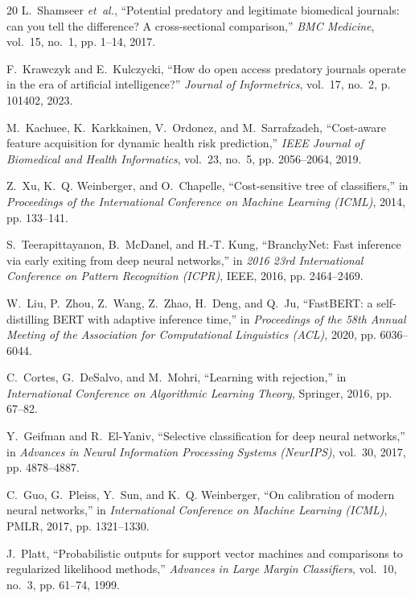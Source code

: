 \documentclass[journal]{IEEEtran}
\begin{document}
\begin{thebibliography}{20}
L.~Shamseer \emph{et~al.}, ``Potential predatory and legitimate biomedical journals: can you tell the difference? A cross-sectional comparison,'' \emph{BMC Medicine}, vol.~15, no.~1, pp. 1--14, 2017.

F.~Krawczyk and E.~Kulczycki, ``How do open access predatory journals operate in the era of artificial intelligence?'' \emph{Journal of Informetrics}, vol.~17, no.~2, p. 101402, 2023.

M.~Kachuee, K.~Karkkainen, V.~Ordonez, and M.~Sarrafzadeh, ``Cost-aware feature acquisition for dynamic health risk prediction,'' \emph{IEEE Journal of Biomedical and Health Informatics}, vol.~23, no.~5, pp. 2056--2064, 2019.

Z.~Xu, K.~Q. Weinberger, and O.~Chapelle, ``Cost-sensitive tree of classifiers,'' in \emph{Proceedings of the International Conference on Machine Learning (ICML)}, 2014, pp. 133--141.

S.~Teerapittayanon, B.~McDanel, and H.-T. Kung, ``BranchyNet: Fast inference via early exiting from deep neural networks,'' in \emph{2016 23rd International Conference on Pattern Recognition (ICPR)}, IEEE, 2016, pp. 2464--2469.

W.~Liu, P.~Zhou, Z.~Wang, Z.~Zhao, H.~Deng, and Q.~Ju, ``FastBERT: a self-distilling BERT with adaptive inference time,'' in \emph{Proceedings of the 58th Annual Meeting of the Association for Computational Linguistics (ACL)}, 2020, pp. 6036--6044.

C.~Cortes, G.~DeSalvo, and M.~Mohri, ``Learning with rejection,'' in \emph{International Conference on Algorithmic Learning Theory}, Springer, 2016, pp. 67--82.

Y.~Geifman and R.~El-Yaniv, ``Selective classification for deep neural networks,'' in \emph{Advances in Neural Information Processing Systems (NeurIPS)}, vol.~30, 2017, pp. 4878--4887.

C.~Guo, G.~Pleiss, Y.~Sun, and K.~Q. Weinberger, ``On calibration of modern neural networks,'' in \emph{International Conference on Machine Learning (ICML)}, PMLR, 2017, pp. 1321--1330.

J.~Platt, ``Probabilistic outputs for support vector machines and comparisons to regularized likelihood methods,'' \emph{Advances in Large Margin Classifiers}, vol.~10, no.~3, pp. 61--74, 1999.
\end{thebibliography}
\end{document}
